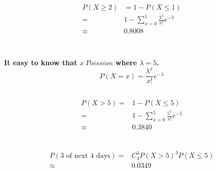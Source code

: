 \documentclass{article}
\begin{document}
            \paragraph{
                \begin{equation*}
                    \begin{split}
                        P(X\geq 2)&=1-P(X\leq 1)\\
                            =&1-\sum_{x=0}^1 \frac{3^x}{x!}e^{-3}\\
                            \approx&0.8008\\
                    \end{split}
                \end{equation*}
            }
    \section{}
        \paragraph{
            It easy to know that $x~Poission$ where $\lambda=5$.
            $$P(X=x)=\frac{\lambda^x}{x!}e^{-\lambda}$$
        }
        \subsection{}
            \paragraph{
                \begin{equation*}
                    \begin{split}
                        P(X>5)=&1-P(X\leq 5)\\
                            =&1-\sum_{x=0}^5\frac{5^x}{x!}e^{-5}\\
                            \approx&0.3840\\
                    \end{split}
                \end{equation*}
            }
        \subsection{}
            \paragraph{
                \begin{equation*}
                    \begin{split}
                        P(\text{3 of next 4 days})=&C_4^3 P(X>5)^3 P(X\leq 5)\\
                            \approx&0.0349\\
                    \end{split}
                \end{equation*}
            }
\end{document}
